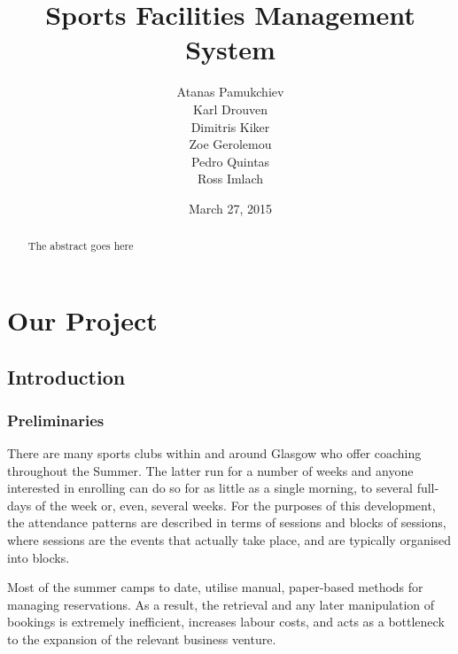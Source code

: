 \documentclass{l3proj}
\begin{document}
\title{Sports Facilities Management System}
\author{Atanas Pamukchiev \\
        Karl Drouven \\
        Dimitris Kiker \\
        Zoe Gerolemou \\
        Pedro Quintas\\
        Ross Imlach}
\date{March 27, 2015}
\maketitle
\begin{abstract}

The abstract goes here

\end{abstract}
\educationalconsent
\tableofcontents

\chapter{Our Project}
\label{ourproject}

\section{Introduction}

\subsection{Preliminaries}

\par There are many sports clubs within and around Glasgow who offer coaching throughout the Summer. The latter run for a number of weeks and anyone interested in enrolling can do so for as little as a single morning, to several full-days of the week or, even, several weeks. For the purposes of this development, the attendance patterns are described in terms of sessions and blocks of sessions, where sessions are the events that actually take place, and are typically organised into blocks.

\par Most of the summer camps to date, utilise manual, paper-based methods for managing reservations. As a result, the retrieval and any later manipulation of bookings is extremely inefficient, increases labour costs, and acts as a bottleneck to the expansion of the relevant business venture.
\end{document}
